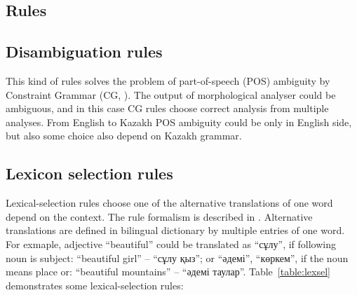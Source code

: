 \documentclass[11pt]{article}
\begin{document}
\subsection{Rules}

\subsection{Disambiguation rules}

This kind of rules solves the problem of part-of-speech (POS) ambiguity by Constraint Grammar (CG, \cite{karlsson95}). The 
output of morphological analyser could be ambiguous, and in this case CG rules choose correct analysis from 
multiple analyses. From English to Kazakh POS ambiguity could be only in English side, but also some choice also
depend on Kazakh grammar.

\subsection{Lexicon selection rules }

Lexical-selection rules choose one of the alternative translations of one word depend on the context. The rule 
formalism is described in \cite{tyers12a}. Alternative translations are defined in bilingual dictionary by 
multiple entries of one word. For exmaple, adjective ``beautiful'' could be translated as ``сұлу'', if 
following noun is subject: ``beautiful girl'' -- ``сұлу қыз''; or ``әдемі'', ``көркем'', if the noun means 
place or: ``beautiful mountains'' -- ``әдемі таулар''.  Table~\ref{table:lexsel} demonstrates some 
lexical-selection rules:
\end{document}

